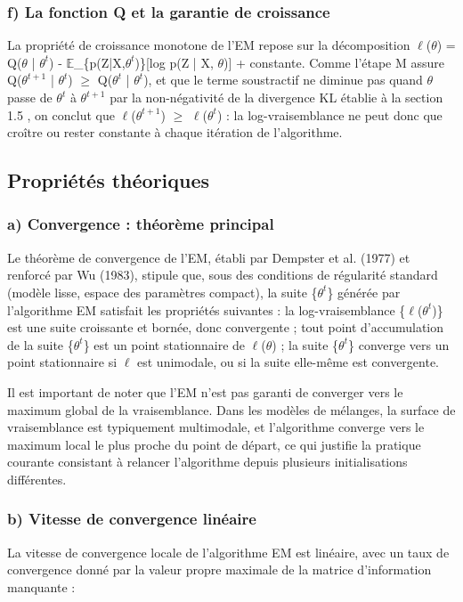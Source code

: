 \subsubsection{f) La fonction Q et la garantie de croissance}
La propriété de croissance monotone de l'EM repose sur la décomposition $\ell $($\theta $) = Q($\theta $ | $\theta ^{t}$) - $\mathbb{E}$\_\{p(Z|X,$\theta ^{t}$)\}[log p(Z | X, $\theta $)] + constante. Comme l'étape M assure Q($\theta ^{t+1}$ | $\theta ^{t}$) $\geq $ Q($\theta ^{t}$ | $\theta ^{t}$), et que le terme soustractif ne diminue pas quand $\theta $ passe de $\theta ^{t}$ à $\theta ^{t+1}$  par la non-négativité de la divergence KL établie à la section 1.5 , on conclut que $\ell $($\theta ^{t+1}$) $\geq $ $\ell $($\theta ^{t}$) : la log-vraisemblance ne peut donc que croître ou rester constante à chaque itération de l'algorithme.

\subsection{Propriétés théoriques}
\subsubsection{a) Convergence : théorème principal}
Le théorème de convergence de l'EM, établi par Dempster et al. (1977) et renforcé par Wu (1983), stipule que, sous des conditions de régularité standard (modèle lisse, espace des paramètres compact), la suite \{$\theta ^{t}$\} générée par l'algorithme EM satisfait les propriétés suivantes : la log-vraisemblance \{$\ell $($\theta ^{t}$)\} est une suite croissante et bornée, donc convergente ; tout point d'accumulation de la suite \{$\theta ^{t}$\} est un point stationnaire de $\ell $($\theta $) ; la suite \{$\theta ^{t}$\} converge vers un point stationnaire si $\ell $ est unimodale, ou si la suite elle-même est convergente.

Il est important de noter que l'EM n'est pas garanti de converger vers le maximum global de la vraisemblance. Dans les modèles de mélanges, la surface de vraisemblance est typiquement multimodale, et l'algorithme converge vers le maximum local le plus proche du point de départ, ce qui justifie la pratique courante consistant à relancer l'algorithme depuis plusieurs initialisations différentes.

\subsubsection{b) Vitesse de convergence linéaire}
La vitesse de convergence locale de l'algorithme EM est linéaire, avec un taux de convergence donné par la valeur propre maximale de la matrice d'information manquante :

